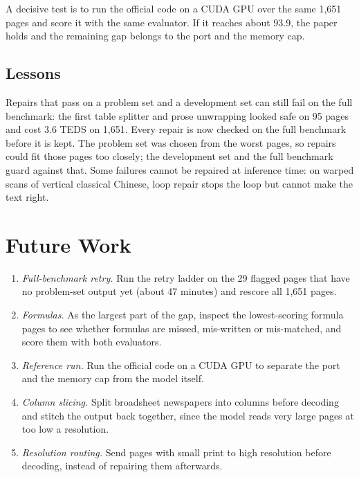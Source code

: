 \documentclass[journal]{IEEEtran}
\begin{document}
A decisive test is to run the official code on a CUDA GPU over the same 1,651
pages and score it with the same evaluator. If it reaches about 93.9, the paper
holds and the remaining gap belongs to the port and the memory cap.

\subsection{Lessons}

Repairs that pass on a problem set and a development set can still fail on the
full benchmark: the first table splitter and prose unwrapping looked safe on 95
pages and cost 3.6 TEDS on 1,651. Every repair is now checked on the full
benchmark before it is kept. The problem set was chosen from the worst pages,
so repairs could fit those pages too closely; the development set and the full
benchmark guard against that. Some failures cannot be repaired at inference
time: on warped scans of vertical classical Chinese, loop repair stops the loop
but cannot make the text right.

\section{Future Work}

\begin{enumerate}
\item \emph{Full-benchmark retry.} Run the retry ladder on the 29 flagged pages
that have no problem-set output yet (about 47 minutes) and rescore all 1,651
pages.
\item \emph{Formulas.} As the largest part of the gap, inspect the
lowest-scoring formula pages to see whether formulas are missed, mis-written or
mis-matched, and score them with both evaluators.
\item \emph{Reference run.} Run the official code on a CUDA GPU to separate the
port and the memory cap from the model itself.
\item \emph{Column slicing.} Split broadsheet newspapers into columns before
decoding and stitch the output back together, since the model reads very large
pages at too low a resolution.
\item \emph{Resolution routing.} Send pages with small print to high resolution
before decoding, instead of repairing them afterwards.
\end{enumerate}

\end{document}
